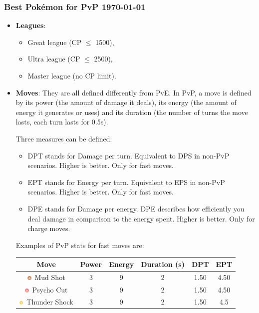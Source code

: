 \documentclass[12pt]{beamer}
\newcommand{\psysimp}{\includegraphics[height=0.2cm]{../../images/type/simplified/psy.png}}
\newcommand{\groundsimp}{\includegraphics[height=0.2cm]{../../images/type/simplified/ground.png}}
\newcommand{\electricsimp}{\includegraphics[height=0.2cm]{../../images/type/simplified/electric.png}}
\begin{document}
\begin{frame}
\frametitle{Best Pok\'emon for PvP \hspace{7cm} \today}

\begin{block}{}
\begin{footnotesize}
\begin{itemize}
  \item \textbf{Leagues}: 
  \begin{itemize}
  \item \footnotesize Great league (CP $\leq$ 1500), 
  \item \footnotesize Ultra league (CP $\leq$ 2500),
  \item \footnotesize Master league (no CP limit).
\end{itemize}
 \item \textbf{Moves}: They are all defined differently from PvE. In PvP, a move is defined by its power (the amount of damage it deals), its energy (the amount of energy it generates or uses) and its duration (the number of turns the move lasts, each turn lasts for 0.5s).
 
 Three measures can be defined:
 \begin{itemize} 
 \item \footnotesize DPT stands for Damage per turn. Equivalent to DPS in non-PvP scenarios. Higher is better. Only for fast moves.
 \item \footnotesize EPT stands for Energy per turn. Equivalent to EPS in non-PvP scenarios. Higher is better. Only for fast moves.
\item \footnotesize DPE stands for Damage per energy. DPE describes how efficiently you deal damage in comparison to the energy spent. Higher is better. Only for charge moves.
\end{itemize}

 Examples of PvP stats for fast moves are:
\begin{center}
\begin{tabular}{cccccc}
Move & Power & Energy & Duration (s) & DPT & EPT \\ \hline
\groundsimp~Mud Shot & 3& 9 &2 & 1.50 &4.50 \\
\psysimp~Psycho Cut & 3 & 9& 2 &1.50& 4.50 \\
\electricsimp~Thunder Shock & 3 & 9& 2 &1.50 &4.5 \\
\end{tabular}
\end{center}


\end{itemize}
\end{footnotesize}
\end{block}
\end{frame}
\end{document}
